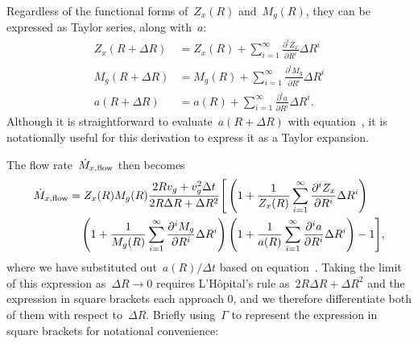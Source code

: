 \documentclass[main.tex]{subfiles}
\begin{document}
Regardless of the functional forms of~$Z_x(R)$ and~$M_g(R)$, they can be
expressed as Taylor series, along with~$a$:
\begin{subequations}\begin{align}
Z_x(R + \Delta R) &= Z_x(R) + \sum_{i = 1}^\infty
\frac{\partial^i Z_x}{\partial R^i} \Delta R^i
\\
M_g(R + \Delta R) &= M_g(R) + \sum_{i = 1}^\infty
\frac{\partial^i M_g}{\partial R^i} \Delta R^i
\\
a(R + \Delta R) &= a(R) + \sum_{i = 1}^\infty
\frac{\partial^i a}{\partial R^i} \Delta R^i.
\end{align}\end{subequations}
Although it is straightforward to evaluate~$a(R + \Delta R)$ with
equation~, it is notationally useful for this
derivation to express it as a Taylor expansion.
\par
The flow rate~$\dot{M}_{x,\text{flow}}$ then becomes
\begin{equation}\begin{split}
\dot{M}_{x,\text{flow}} &= Z_x(R) M_g(R)
\frac{2 R v_g + v_g^2 \Delta t}{2 R \Delta R + \Delta R^2}
\Bigg[
\left(1 + \frac{1}{Z_x(R)}
\sum_{i = 1}^\infty \frac{\partial^i Z_x}{\partial R^i} \Delta R^i\right)
\\
&\quad
\left(1 + \frac{1}{M_g(R)}
\sum_{i = 1}^\infty \frac{\partial^i M_g}{\partial R^i} \Delta R^i\right)
\left(1 + \frac{1}{a(R)}
\sum_{i = 1}^\infty \frac{\partial^i a}{\partial R^i} \Delta R^i\right)
- 1\Bigg],
\label{outflows:eq:flowrate-taylor-series}
\end{split}\end{equation}
where we have substituted out~$a(R) / \Delta t$ based on
equation~. 
Taking the limit of this expression as~$\Delta R \rightarrow 0$ requires
L'H\^opital's rule as~$2 R \Delta R + \Delta R^2$ and the expression in square
brackets each approach 0, and we therefore differentiate both of them with
respect to~$\Delta R$.
Briefly using~$\Gamma$ to represent the expression in square brackets for
notational convenience:
\end{document}
